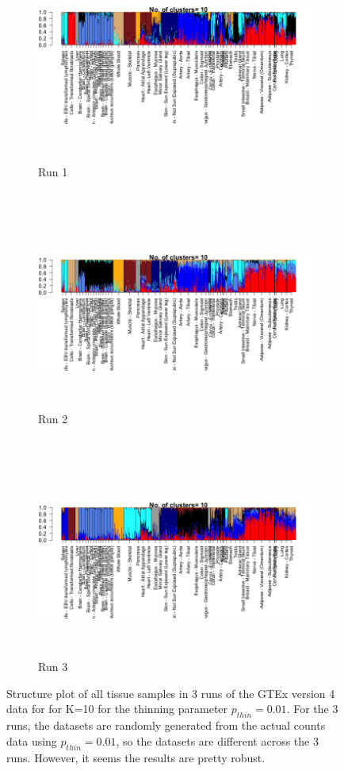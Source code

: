     
     \begin{figure}[ht]
    \raggedright
     \begin{subfigure}[t]{0.25\textwidth}
        \raggedleft
        \includegraphics[height=2.5in]{../plots/multiple_thinned_1.png}
        \caption{Run 1}
    \end{subfigure}    \\
    \begin{subfigure}[t]{0.25\textwidth}
        \raggedleft
        \includegraphics[height=2.5in]{../plots/multiple_thinned_2.png}
        \caption{Run 2}
    \end{subfigure}   \\
    \begin{subfigure}[t]{0.25\textwidth}
        \raggedleft
        \includegraphics[height=2.5in]{../plots/multiple_thinned_4.png}
        \caption{Run 3}
    \end{subfigure} 
    \caption{Structure plot of all tissue samples in 3 runs of the GTEx version 4 data for for K=10 for the thinning parameter $p_{thin}=0.01$. For the 3 runs, the datasets are randomly generated from the actual counts data using $p_{thin}=0.01$, so the datasets are different across the 3 runs. However, it seems the results are pretty robust.}
    \end{figure}

